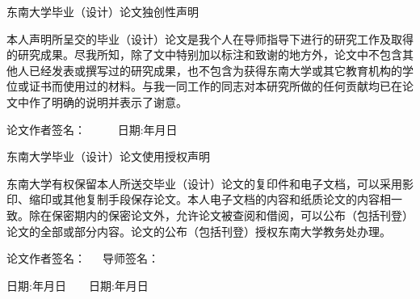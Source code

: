 \newpage
\begin{spacing}{1.43}
\begin{center} 
    \xiaoerhao\heiti
    \vspace*{3em}
    东南大学毕业（设计）论文独创性声明
    \vspace*{1em}
\end{center}

\xiaosihao\songti

本人声明所呈交的毕业（设计）论文是我个人在导师指导下进行的研究工作及取得的研究成果。尽我所知，除了文中特别加以标注和致谢的地方外，论文中不包含其他人已经发表或撰写过的研究成果，也不包含为获得东南大学或其它教育机构的学位或证书而使用过的材料。与我一同工作的同志对本研究所做的任何贡献均已在论文中作了明确的说明并表示了谢意。


\begin{center}
    论文作者签名： \fixedUnderline[6em]{}~~~~~日期:\fixedUnderline[4em]{}年\fixedUnderline[4em]{}月\fixedUnderline[4em]{}日    
\end{center}


\vspace*{4em}


\begin{center} 
    \xiaoerhao\heiti
    \vspace*{1em}
    \hspace*{1.5em}东南大学毕业（设计）论文使用授权声明
    \vspace*{0.5em}
\end{center} 

\xiaosihao\songti

东南大学有权保留本人所送交毕业（设计）论文的复印件和电子文档，可以采用影印、缩印或其他复制手段保存论文。本人电子文档的内容和纸质论文的内容相一致。除在保密期内的保密论文外，允许论文被查阅和借阅，可以公布（包括刊登）论文的全部或部分内容。论文的公布（包括刊登）授权东南大学教务处办理。

\begin{center}
    论文作者签名：\fixedUnderline[13em]{}~~~导师签名：\fixedUnderline[11em]{}

    日期:\fixedUnderline[4em]{}年\fixedUnderline[4em]{}月\fixedUnderline[4em]{}日~~~~日期:\fixedUnderline[4em]{}年\fixedUnderline[4em]{}月\fixedUnderline[4em]{}日        
\end{center}

\thispagestyle{empty}
\end{spacing}